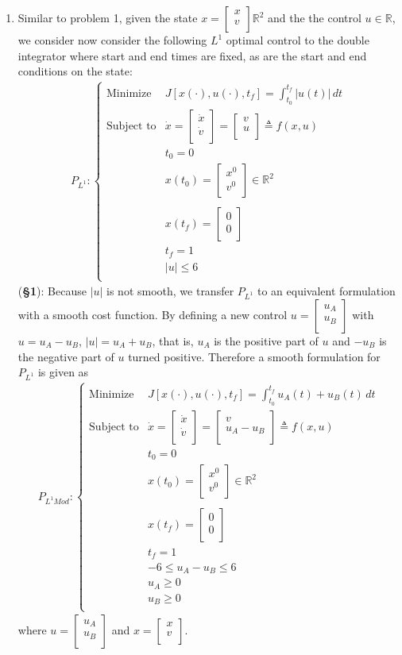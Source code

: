 \documentclass[10pt]{article}
\newcommand{\mat}[2][ccccccccccccccc]{\left [\!\!\begin{array}{#1} #2\\ \end{array} \!\!\right]}
\newcommand{\piece}[2][cll]{\left \{\begin{array}{#1} #2\\ \end{array} \right. }
\newcommand{\abs}[1]{ \left|#1\right|}
\newcommand{\bbr}{\mathbb{R}}
\begin{document}
\begin{enumerate}[leftmargin=*]
\item Similar to problem 1, given the state $x = \mat{x\\v}\bbr^2$ and the the control $u\in\bbr$, we consider now consider the following $L^1$ optimal control to the double integrator where start and end times are fixed, as are the start and end conditions on the state:
    \begin{align*}
            P_{L^1} : \piece{ \text{Minimize} & J[x(\cdot), u(\cdot), t_f] = \int_{t_0}^{t_f}\abs{u(t)}\,dt \\
                    \text{Subject to} & \dot x = \mat{\dot x \\ \dot v} = \mat{v \\ u }\triangleq f(x,u) \\
                     & t_0 = 0 \\
                     & x(t_0)=\mat{x^0\\v^0}\in\bbr^2 \\\\
                     & x(t_f)=\mat{0\\0} \\
                     & t_f=1\\
                     & \abs{u}\le 6
                 }
    \end{align*}
    (\textbf{\S1}): Because $\abs{u}$ is not smooth, we transfer $P_{L^1}$ to an equivalent formulation with a smooth cost function.  By defining a new control $u = \mat{u_A\\u_B}$ with $u = u_A-u_B$, $\abs{u}=u_A+u_B$, that is, $u_A$ is the positive part of $u$ and $-u_B$ is the negative part of $u$ turned positive.  Therefore a smooth formulation for $P_{L^1}$ is given as
    \begin{align*}
            P_{L^1Mod} : \piece{ \text{Minimize} & J[x(\cdot), u(\cdot), t_f] = \int_{t_0}^{t_f}u_A(t)+u_B(t)\,dt \\
                    \text{Subject to} & \dot x = \mat{\dot x \\ \dot v} = \mat{v \\ u_A-u_B }\triangleq f(x,u) \\
                     & t_0 = 0 \\
                     & x(t_0)=\mat{x^0\\v^0}\in\bbr^2 \\\\
                     & x(t_f)=\mat{0\\0} \\
                     & t_f=1\\
                     & -6\le u_A-u_B\le 6 \\
                     & u_A\ge0 \\
                     & u_B\ge0
                     }
    \end{align*}
    where $u = \mat{u_A\\u_B}$ and $x=\mat{x\\v}$.


\end{enumerate}
\end{document}
